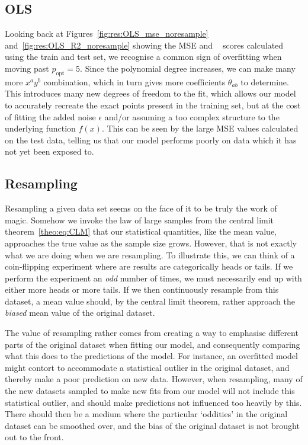 \documentclass[twocolumn,english,notitlepage]{article}
\DeclareMathOperator{\Rsquared}{R^2}
\newcommand{\msub}[2]{\ensuremath{{#1}_\text{#2}}}
\begin{document}
    \subsection{OLS}
        Looking back at Figures~\ref{fig:res:OLS_mse_noresample} and~\ref{fig:res:OLS_R2_noresample} showing the MSE and $\Rsquared$ scores calculated using the train and test set, we recognise a common sign of overfitting when moving past $\msub{p}{opt} = 5$. Since the polynomial degree increases, we can make many more $x^ay^b$ combination, which in turn gives more coefficients $\theta_{ab}$ to determine. This introduces many new degrees of freedom to the fit, which allows our model to accurately recreate the exact points present in the training set, but at the cost of fitting the added noise $\epsilon$ and/or assuming a too complex structure to the underlying function $f(x)$. This can be seen by the large MSE values calculated on the test data, telling us that our model performs poorly on data which it has not yet been exposed to.

    \subsection{Resampling}
        Resampling a given data set seems on the face of it to be truly the work of magic. Somehow we invoke the law of large samples from the central limit theorem~\eqref{theo:eq:CLM} that our statistical quantities, like the mean value, approaches the true value as the sample size grows. However, that is not exactly what we are doing when we are resampling. To illustrate this, we can think of a coin-flipping experiment where are results are categorically heads or tails. If we perform the experiment an \textit{odd} number of times, we must necessarily end up with either more heads or more tails. If we then continuously resample from this dataset, a mean value should, by the central limit theorem, rather approach the \textit{biased} mean value of the original dataset.

        The value of resampling rather comes from creating a way to emphasise different parts of the original dataset when fitting our model, and consequently comparing what this does to the predictions of the model. For instance, an overfitted model might contort to accommodate a statistical outlier in the original dataset, and thereby make a poor prediction on new data. However, when resampling, many of the new datasets sampled to make new fits from our model will not include this statistical outlier, and should make predictions not influenced too heavily by this. There should then be a medium where the particular `oddities' in the original dataset can be smoothed over, and the bias of the original dataset is not brought out to the front.
\end{document}

